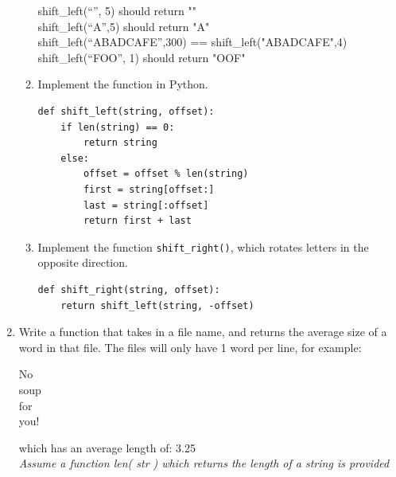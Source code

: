 \documentclass[11pt]{article}
\newenvironment{answer}{\large\lstset{basicstyle=\large}\color{white}}{}
\newenvironment{answer}{\large\lstset{basicstyle=\large}\color{red}}{}
\begin{document}
\begin{enumerate}
\begin{enumerate}
            \begin{answer}
                shift\_left(``'', 5) should return ""\\
                shift\_left(``A'',5) should return "A"\\
                shift\_left(``ABADCAFE'',300) == shift\_left("ABADCAFE",4)\\
                shift\_left(``FOO'', 1) should return "OOF"
            \end{answer}

        \item Implement the function in Python.

\begin{answer}
\begin{lstlisting}
def shift_left(string, offset):
    if len(string) == 0:
        return string
    else:
        offset = offset % len(string)
        first = string[offset:]
        last = string[:offset]
        return first + last
\end{lstlisting}
\end{answer}

        \item Implement the function {\tt shift\_right()}, which rotates letters
            in the opposite direction.

\begin{answer}
\begin{lstlisting}
def shift_right(string, offset):
    return shift_left(string, -offset)
\end{lstlisting}
\vspace{0.5in}
\end{answer}

    \end{enumerate}

    \item Write a function that takes in a file name, and returns the average
        size of a word in that file. The files will only have 1 word per line,
        for example:

        \begin{center}
        No\\
        soup\\
        for\\
        you!
        \end{center}

        which has an average length of: 3.25 \\ \emph{Assume a function len( str ) which returns the length of a string is provided}



\end{enumerate}
\end{document}
